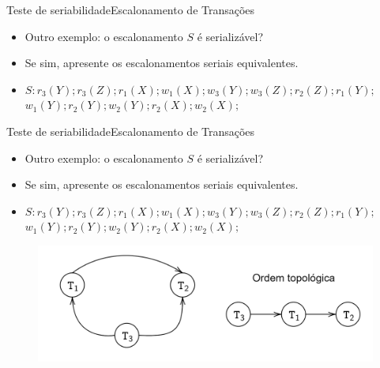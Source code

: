 \documentclass[t]{beamer}
\begin{document}

\begin{ftst}{Teste de seriabilidade}{Escalonamento de Transações}

\begin{itemize}
    \item Outro exemplo: o escalonamento $S$ é serializável? 
    \item Se sim, apresente os escalonamentos seriais equivalentes.
    \item $S: r_3(Y); r_3(Z); r_1(X); w_1(X); w_3(Y); w_3(Z); r_2(Z); r_1(Y);$ 
    $w_1(Y); r_2(Y); w_2(Y); r_2(X); w_2(X);$
\end{itemize}

\end{ftst}


\begin{ftst}{Teste de seriabilidade}{Escalonamento de Transações}

\begin{itemize}
    \item Outro exemplo: o escalonamento $S$ é serializável? 
    \item Se sim, apresente os escalonamentos seriais equivalentes.
    \item $S: r_3(Y); r_3(Z); r_1(X); w_1(X); w_3(Y); w_3(Z); r_2(Z); r_1(Y);
    $ $w_1(Y); r_2(Y); w_2(Y); r_2(X); w_2(X);$
\end{itemize}
\begin{figure}
    \centering
    \includegraphics[scale=0.11]{Figuras_transacoes/22.png}
\end{figure}


\end{ftst}

\end{document}
